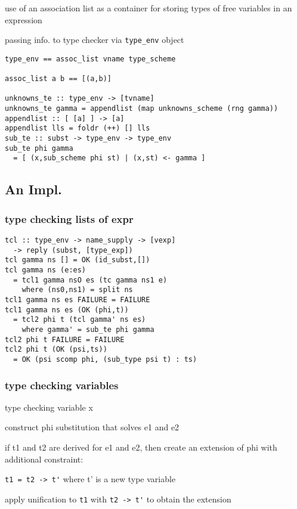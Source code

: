 \documentclass[8pt]{extarticle}
\begin{document}
\begin{multicols*}{2}
use of an association list as a container for storing types of free variables in an expression

passing info. to type checker via \verb|type_env| object

\begin{verbatim}
type_env == assoc_list vname type_scheme

assoc_list a b == [(a,b)]

unknowns_te :: type_env -> [tvname]
unknowns_te gamma = appendlist (map unknowns_scheme (rng gamma))
appendlist :: [ [a] ] -> [a]
appendlist lls = foldr (++) [] lls
sub_te :: subst -> type_env -> type_env
sub_te phi gamma
  = [ (x,sub_scheme phi st) | (x,st) <- gamma ]
\end{verbatim}

\vfill\null
\columnbreak

\subsection{An Impl.}

\subsubsection{type checking lists of expr}
\begin{verbatim}
tcl :: type_env -> name_supply -> [vexp]
  -> reply (subst, [type_exp])
tcl gamma ns [] = OK (id_subst,[])
tcl gamma ns (e:es)
  = tcl1 gamma nsO es (tc gamma ns1 e)
    where (ns0,ns1) = split ns
tcl1 gamma ns es FAILURE = FAILURE
tcl1 gamma ns es (OK (phi,t))
  = tcl2 phi t (tcl gamma' ns es)
    where gamma' = sub_te phi gamma
tcl2 phi t FAILURE = FAILURE
tcl2 phi t (OK (psi,ts))
  = OK (psi scomp phi, (sub_type psi t) : ts)
\end{verbatim}

\subsubsection{type checking variables}

type checking variable x

construct phi substitution that solves e1 and e2

if t1 and t2 are derived for e1 and e2, then create an extension of phi with additional constraint:

\verb|t1 = t2 -> t'| where t' is a new type variable

apply unification to \verb|t1| with \verb|t2 -> t'| to obtain the extension


\end{multicols*}
\end{document}

